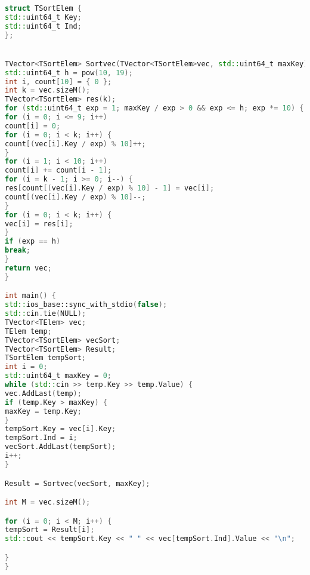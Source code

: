 \begin{lstlisting}[language=C++]
struct TSortElem {
std::uint64_t Key;
std::uint64_t Ind;
};


TVector<TSortElem> Sortvec(TVector<TSortElem>vec, std::uint64_t maxKey) {
std::uint64_t h = pow(10, 19);
int i, count[10] = { 0 };
int k = vec.sizeM();
TVector<TSortElem> res(k);
for (std::uint64_t exp = 1; maxKey / exp > 0 && exp <= h; exp *= 10) {
for (i = 0; i <= 9; i++)
count[i] = 0;
for (i = 0; i < k; i++) {
count[(vec[i].Key / exp) % 10]++;
}
for (i = 1; i < 10; i++)
count[i] += count[i - 1];
for (i = k - 1; i >= 0; i--) {
res[count[(vec[i].Key / exp) % 10] - 1] = vec[i];
count[(vec[i].Key / exp) % 10]--;
}
for (i = 0; i < k; i++) {
vec[i] = res[i];
}
if (exp == h)
break;
}
return vec;
}

int main() {
std::ios_base::sync_with_stdio(false);
std::cin.tie(NULL);
TVector<TElem> vec;
TElem temp;
TVector<TSortElem> vecSort;
TVector<TSortElem> Result;
TSortElem tempSort;
int i = 0;
std::uint64_t maxKey = 0;
while (std::cin >> temp.Key >> temp.Value) {
vec.AddLast(temp);
if (temp.Key > maxKey) {
maxKey = temp.Key;
}
tempSort.Key = vec[i].Key;
tempSort.Ind = i;
vecSort.AddLast(tempSort);
i++;
}

Result = Sortvec(vecSort, maxKey);

int M = vec.sizeM();

for (i = 0; i < M; i++) {
tempSort = Result[i];
std::cout << tempSort.Key << " " << vec[tempSort.Ind].Value << "\n";

}
}
\end{lstlisting}

